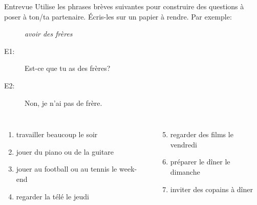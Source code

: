 \begin{frame}{Entrevue}
  Utilise les phrases brèves suivantes pour construire des questions à poser à ton/ta partenaire.
  Écris-les sur un papier à rendre.
  Par exemple: \\
  \begin{description}
    \item[] \emph{avoir des frères}
    \item[E1:] Est-ce que tu as des frères?
    \item[E2:] Non, je n'ai pas de frère.
  \end{description}
  \begin{columns}[t]
      \begin{enumerate}
        \item travailler beaucoup le soir
        \item jouer du piano ou de la guitare
        \item jouer au football ou au tennis le week-end
        \item regarder la télé le jeudi
      \end{enumerate}
      \begin{enumerate}
        \setcounter{enumi}{4}
        \item regarder des films le vendredi
        \item préparer le dîner le dimanche
        \item inviter des copains à dîner
      \end{enumerate}
  \end{columns}
\end{frame}